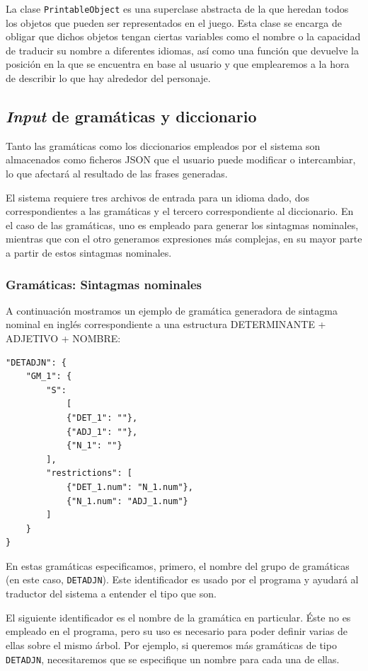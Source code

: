 La clase \texttt{PrintableObject} es una superclase abstracta de la que heredan todos los objetos que pueden ser representados en el juego. Esta clase se encarga de obligar que dichos objetos tengan ciertas variables como el nombre o la capacidad de traducir su nombre a diferentes idiomas, así como una función que devuelve la posición en la que se encuentra en base al usuario y que emplearemos a la hora de describir lo que hay alrededor del personaje.

\subsection{\textit{Input} de gramáticas y diccionario}

Tanto las gramáticas como los diccionarios empleados por el sistema son almacenados como ficheros JSON que el usuario puede modificar o intercambiar, lo que afectará al resultado de las frases generadas.

El sistema requiere tres archivos de entrada para un idioma dado, dos correspondientes a las gramáticas y el tercero correspondiente al diccionario. En el caso de las gramáticas, uno es empleado para generar los sintagmas nominales, mientras que con el otro generamos expresiones más complejas, en su mayor parte a partir de estos sintagmas nominales.

\subsubsection{Gramáticas: Sintagmas nominales}

A continuación mostramos un ejemplo de gramática generadora de sintagma nominal en inglés correspondiente a una estructura DETERMINANTE + ADJETIVO + NOMBRE:

\begin{lstlisting}[style=json]
"DETADJN": {
    "GM_1": {
        "S": 
            [
            {"DET_1": ""}, 
            {"ADJ_1": ""}, 
            {"N_1": ""}
        ],
        "restrictions": [
            {"DET_1.num": "N_1.num"},
            {"N_1.num": "ADJ_1.num"}
        ]
    }
}
\end{lstlisting}

\noindent En estas gramáticas especificamos, primero, el nombre del grupo de gramáticas (en este caso, \texttt{DETADJN}). Este identificador es usado por el programa y ayudará al traductor del sistema a entender el tipo que son.

El siguiente identificador es el nombre de la gramática en particular. Éste no es empleado en el programa, pero su uso es necesario para poder definir varias de ellas sobre el mismo árbol. Por ejemplo, si queremos más gramáticas de tipo \texttt{DETADJN}, necesitaremos que se especifique un nombre para cada una de ellas.

